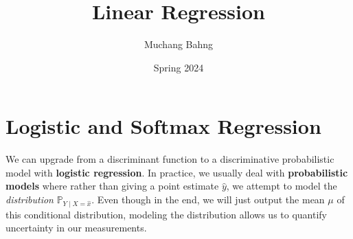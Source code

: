 \documentclass{article}
\begin{document}

\title{Linear Regression}
\author{Muchang Bahng}
\date{Spring 2024}

\maketitle
\tableofcontents
\pagebreak





\section{Logistic and Softmax Regression} 

  We can upgrade from a discriminant function to a discriminative probabilistic model with \textbf{logistic regression}. In practice, we usually deal with \textbf{probabilistic models} where rather than giving a point estimate $\hat{y}$, we attempt to model the \textit{distribution} $\mathbb{P}_{Y \mid X = \hat{x}}$. Even though in the end, we will just output the mean $\mu$ of this conditional distribution, modeling the distribution allows us to quantify uncertainty in our measurements. 
\end{document}
